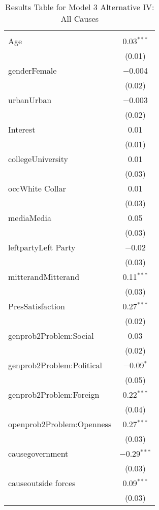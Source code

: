 
\begin{table}[!htbp] \centering 
  \caption{Results Table for Model 3 Alternative IV: All Causes} 
  \label{} 
\footnotesize 
\begin{tabular}{@{\extracolsep{5pt}}lc} 
\\[-1.8ex]\hline \\[-1.8ex] 
\hline \\[-1.8ex] 
 Age & 0.03$^{***}$ \\ 
  & (0.01) \\ 
  genderFemale & $-$0.004 \\ 
  & (0.02) \\ 
  urbanUrban & $-$0.003 \\ 
  & (0.02) \\ 
  Interest & 0.01 \\ 
  & (0.01) \\ 
  collegeUniversity & 0.01 \\ 
  & (0.03) \\ 
  occWhite Collar & 0.01 \\ 
  & (0.03) \\ 
  mediaMedia & 0.05 \\ 
  & (0.03) \\ 
  leftpartyLeft Party & $-$0.02 \\ 
  & (0.03) \\ 
  mitterandMitterand & 0.11$^{***}$ \\ 
  & (0.03) \\ 
  PresSatisfaction & 0.27$^{***}$ \\ 
  & (0.02) \\ 
  genprob2Problem:Social & 0.03 \\ 
  & (0.02) \\ 
  genprob2Problem:Political & $-$0.09$^{*}$ \\ 
  & (0.05) \\ 
  genprob2Problem:Foreign & 0.22$^{***}$ \\ 
  & (0.04) \\ 
  openprob2Problem:Openness & 0.27$^{***}$ \\ 
  & (0.03) \\ 
  causegovernment & $-$0.29$^{***}$ \\ 
  & (0.03) \\ 
  causeoutside forces & 0.09$^{***}$ \\ 
  & (0.03) \\ 

\end{tabular}
\end{table}
